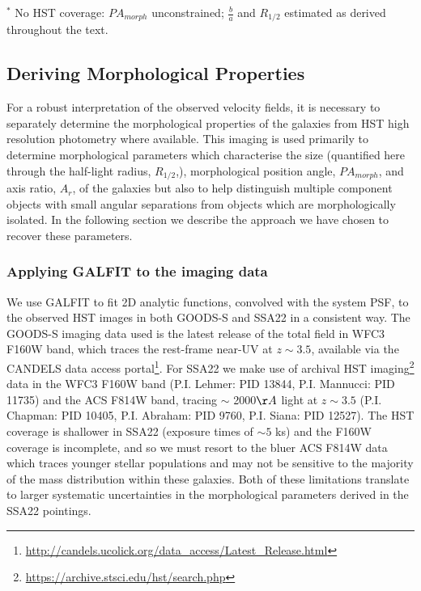 \documentclass[fleqn,usenatbib]{mn2e}
\begin{document}
\begin{table*}
\begin{threeparttable}
\begin{tabular}{ccccccccccc}
\end{tabular}
\begin{tablenotes}
      \small
      \item $^{*}$ No HST coverage: $PA_{morph}$ unconstrained; $\frac{b}{a}$ and $R_{1/2}$ estimated as derived throughout the text.
    \end{tablenotes}
  \end{threeparttable}
  \end{table*}


\subsection{Deriving Morphological Properties}
For a robust interpretation of the observed velocity fields, it is necessary to separately determine the morphological properties of the galaxies from HST high resolution photometry where available.
This imaging is used primarily to determine morphological parameters which characterise the size (quantified here through the half-light radius, $R_{1/2}$,), morphological position angle, $PA_{morph}$, and axis ratio, $A_{r}$, of the galaxies but also to help distinguish multiple component objects with small angular separations from objects which are morphologically isolated.
In the following section we describe the approach we have chosen to recover these parameters.

\subsubsection{Applying GALFIT to the imaging data}\label{subsubsec:galfitting}
We use GALFIT \citep{Peng2010_galfit} to fit 2D analytic functions, convolved with the system PSF, to the observed HST images in both GOODS-S and SSA22 in a consistent way.
The GOODS-S imaging data used is the latest release of the total field in WFC3 F160W band, which traces the rest-frame near-UV at $z \sim 3.5$, available via the CANDELS \citep{Grogin2011,Koekemoer2011} data access portal\footnote{\tiny{\url{http://candels.ucolick.org/data_access/Latest_Release.html}}}.
For SSA22 we make use of archival HST imaging\footnote{\tiny{\url{https://archive.stsci.edu/hst/search.php}}} data in the WFC3 F160W band (P.I. Lehmer: PID 13844, P.I. Mannucci: PID 11735) and the ACS F814W band, tracing $\sim$ 2000$\AA$ light at $z\sim 3.5$ (P.I. Chapman: PID 10405, P.I. Abraham: PID 9760, P.I. Siana: PID 12527).
The HST coverage is shallower in SSA22 (exposure times of $\sim 5$ ks) and the F160W coverage is incomplete, and so we must resort to the bluer ACS F814W data which traces younger stellar populations and may not be sensitive to the majority of the mass distribution within these galaxies.
Both of these limitations translate to larger systematic uncertainties in the morphological parameters derived in the SSA22 pointings.
\end{document}
